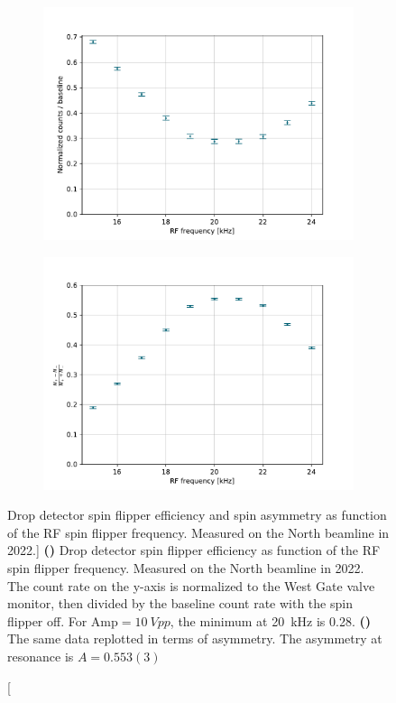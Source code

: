 \begin{figure}
\centering
\begin{subfigure}{.5\textwidth} 
  \centering
  \includegraphics[width=\textwidth]{figures/2022_single_arm_spin_flip_eff.pdf}
  \caption{}\label{subfig:2022_single_arm_eff}
\end{subfigure}%
\begin{subfigure}{.5\textwidth}
  \centering
  \includegraphics[width=\textwidth]{figures/2022_single_arm_spin_flip_asymmetry.pdf}
  \caption{}\label{subfig:2022_single_arm_asym}
\end{subfigure}
\caption
    [Drop detector spin flipper efficiency and spin asymmetry as function of the RF spin flipper frequency. Measured on the North beamline in 2022.]
    {\textbf{()} Drop detector spin flipper efficiency as function of the RF spin flipper frequency. Measured on the North beamline in 2022. The count rate on the y-axis is normalized to the West Gate valve monitor, then divided by the baseline count rate with the spin flipper off. For $\text{Amp}=\qty{10}{Vpp}$, the minimum at \qty{20}{kHz} is 0.28. \textbf{()} The same data replotted in terms of asymmetry. The asymmetry at resonance is $A=0.553(3)$}
\label{fig:2022_single_arm_asymmetry}
\end{figure}

